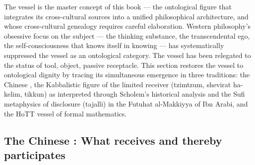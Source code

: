The vessel is the master concept of this book --- the ontological figure that integrates its cross-cultural sources into a unified philosophical architecture, and whose cross-cultural genealogy requires careful elaboration. Western philosophy’s obsessive focus on the subject — the thinking substance, the transcendental ego, the self-consciousness that knows itself in knowing — has systematically suppressed the vessel as an ontological category. The vessel has been relegated to the status of tool, object, passive receptacle. This section restores the vessel to ontological dignity by tracing its simultaneous emergence in three traditions: the Chinese , the Kabbalistic figure of the limited receiver (tzimtzum, shevirat ha-kelim, tikkun) as interpreted through Scholem’s historical analysis and the Sufi metaphysics of disclosure (tajalli) in the Futuhat al-Makkiyya of Ibn Arabi, and the HoTT vessel of formal mathematics.

\subsection{The Chinese : What receives and thereby participates}

